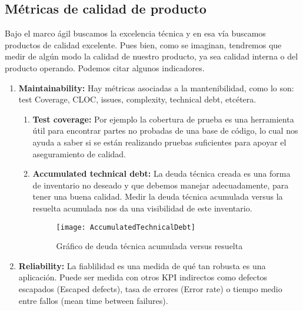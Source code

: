 \subsection{Métricas de calidad de producto}

Bajo el marco ágil buscamos la excelencia técnica y en esa vía buscamos productos de calidad excelente. Pues bien, como se imaginan, tendremos que medir de algún modo la calidad de nuestro producto, ya sea calidad interna o del producto operando. Podemos citar algunos indicadores.

  \begin{enumerate}    

  \item {\textbf{Maintainability:} Hay métricas asociadas a la mantenibilidad, como lo son: test Coverage, CLOC, issues, complexity, technical debt, etcétera. 
  
    \begin{enumerate}    
    \item {\textbf{Test coverage:}
Por ejemplo la cobertura de prueba es una herramienta útil para encontrar partes no probadas de una base de código, lo cual nos ayuda a saber si se están realizando pruebas suficientes para apoyar el aseguramiento de calidad.
}
    \item {\textbf{Accumulated technical debt:}
La deuda técnica creada es una forma de inventario no deseado y que debemos manejar adecuadamente, para tener una buena calidad. Medir la deuda técnica acumulada versus la resuelta acumulada nos da una visibilidad de este inventario.
}

  \begin{figure}[h]
  \centering
  \texttt{[image: AccumulatedTechnicalDebt]}
  \caption{Gráfico de deuda técnica acumulada versus resuelta}
  \centering
  \label{fig:AccumulatedTechnicalDebt} %
  \end{figure}
  \FloatBarrier

  \end{enumerate}
}

  \item {\textbf{Reliability:} La fiablilidad es una medida de qué tan robusta es una aplicación. Puede ser medida con otros KPI indirectos como defectos escapados (Escaped defects), tasa de errores (Error rate) o tiempo medio entre fallos (mean time between failures).
  
}
\end{enumerate}
